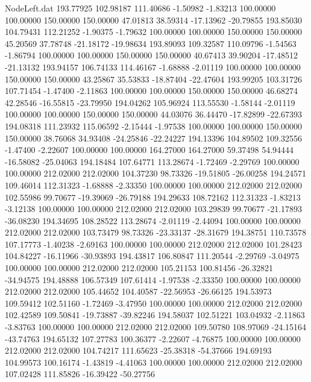 \begin{filecontents}{NodeLeft.dat}
 193.77925  102.98187  111.40686    -1.50982   -1.83213  100.00000  100.00000  150.00000  150.00000   47.01813   38.59314  -17.13962  -20.79855
 193.85030  104.79431  112.21252    -1.90375   -1.79632  100.00000  100.00000  150.00000  150.00000   45.20569   37.78748  -21.18172  -19.98634
 193.89093  109.32587  110.09796    -1.54563   -1.86794  100.00000  100.00000  150.00000  150.00000   40.67413   39.90204  -17.48512  -21.13132
 193.94157  106.74133  114.46167    -1.68888   -2.01119  100.00000  100.00000  150.00000  150.00000   43.25867   35.53833  -18.87404  -22.47604
 193.99205  103.31726  107.71454    -1.47400   -2.11863  100.00000  100.00000  150.00000  150.00000   46.68274   42.28546  -16.55815  -23.79950
 194.04262  105.96924  113.55530    -1.58144   -2.01119  100.00000  100.00000  150.00000  150.00000   44.03076   36.44470  -17.82899  -22.67393
 194.08318  111.23932  115.06592    -2.15444   -1.97538  100.00000  100.00000  150.00000  150.00000   38.76068   34.93408  -24.25846  -22.24227
 194.13396  104.89502  109.32556    -1.47400   -2.22607  100.00000  100.00000  164.27000  164.27000   59.37498   54.94444  -16.58082  -25.04063
 194.18484  107.64771  113.28674    -1.72469   -2.29769  100.00000  100.00000  212.02000  212.02000  104.37230   98.73326  -19.51805  -26.00258
 194.24571  109.46014  112.31323    -1.68888   -2.33350  100.00000  100.00000  212.02000  212.02000  102.55986   99.70677  -19.39069  -26.79188
 194.29633  108.72162  112.31323    -1.83213   -3.12138  100.00000  100.00000  212.02000  212.02000  103.29839   99.70677  -21.17893  -36.08230
 194.34695  108.28522  113.28674    -2.01119   -2.44094  100.00000  100.00000  212.02000  212.02000  103.73479   98.73326  -23.33137  -28.31679
 194.38751  110.73578  107.17773    -1.40238   -2.69163  100.00000  100.00000  212.02000  212.02000  101.28423  104.84227  -16.11966  -30.93893
 194.43817  106.80847  111.20544    -2.29769   -3.04975  100.00000  100.00000  212.02000  212.02000  105.21153  100.81456  -26.32821  -34.94575
 194.48888  106.57349  107.61414    -1.97538   -2.33350  100.00000  100.00000  212.02000  212.02000  105.44652  104.40587  -22.56953  -26.66125
 194.53973  109.59412  102.51160    -1.72469   -3.47950  100.00000  100.00000  212.02000  212.02000  102.42589  109.50841  -19.73887  -39.82246
 194.58037  102.51221  103.04932    -2.11863   -3.83763  100.00000  100.00000  212.02000  212.02000  109.50780  108.97069  -24.15164  -43.74763
 194.65132  107.27783  100.36377    -2.22607   -4.76875  100.00000  100.00000  212.02000  212.02000  104.74217  111.65623  -25.38318  -54.37666
 194.69193  104.99573  100.16174    -1.43819   -4.41063  100.00000  100.00000  212.02000  212.02000  107.02428  111.85826  -16.39422  -50.27756

\end{filecontents}
